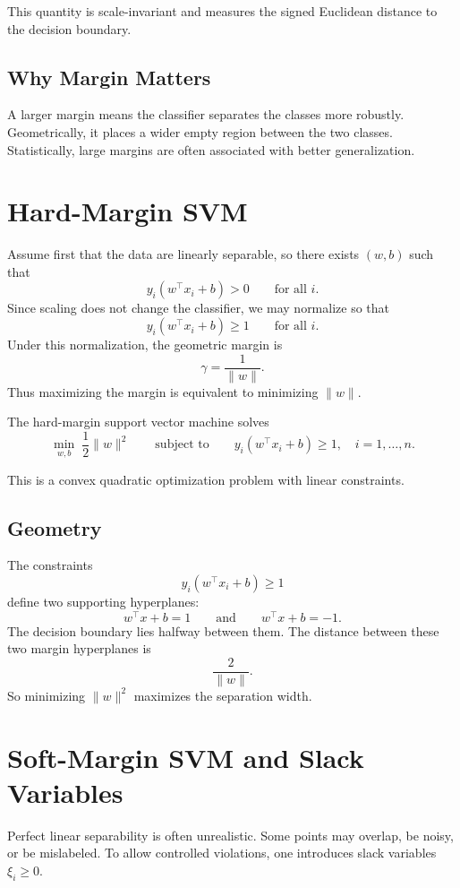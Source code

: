 This quantity is scale-invariant and measures the signed Euclidean distance to the decision boundary.

\subsection{Why Margin Matters}

A larger margin means the classifier separates the classes more robustly. Geometrically, it places a wider empty region between the two classes. Statistically, large margins are often associated with better generalization.

\section{Hard-Margin SVM}

Assume first that the data are linearly separable, so there exists $(w,b)$ such that
\[
y_i(w^\top x_i+b)>0
\qquad\text{for all } i.
\]
Since scaling does not change the classifier, we may normalize so that
\[
y_i(w^\top x_i+b)\ge 1
\qquad\text{for all } i.
\]
Under this normalization, the geometric margin is
\[
\gamma=\frac{1}{\|w\|}.
\]
Thus maximizing the margin is equivalent to minimizing $\|w\|$.

\begin{definition}
The hard-margin support vector machine solves
\[
\min_{w,b}\; \frac12\|w\|^2
\qquad\text{subject to}\qquad
y_i(w^\top x_i+b)\ge 1,\quad i=1,\dots,n.
\]
\end{definition}

This is a convex quadratic optimization problem with linear constraints.

\subsection{Geometry}

The constraints
\[
y_i(w^\top x_i+b)\ge 1
\]
define two supporting hyperplanes:
\[
w^\top x+b=1
\qquad\text{and}\qquad
w^\top x+b=-1.
\]
The decision boundary lies halfway between them. The distance between these two margin hyperplanes is
\[
\frac{2}{\|w\|}.
\]
So minimizing $\|w\|^2$ maximizes the separation width.

\section{Soft-Margin SVM and Slack Variables}

Perfect linear separability is often unrealistic. Some points may overlap, be noisy, or be mislabeled. To allow controlled violations, one introduces slack variables $\xi_i\ge 0$.

